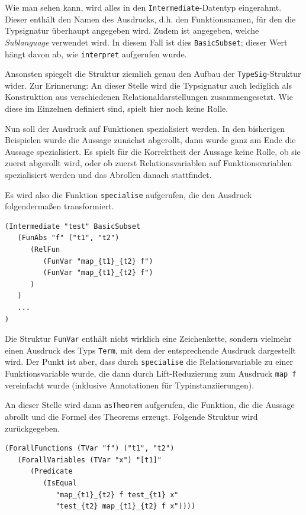 Wie man sehen kann, wird alles in den \texttt{Intermediate}-Datentyp eingerahmt. Dieser enthält den Namen des Ausdrucks, d.h.
den Funktionsnamen, für den die Typsignatur überhaupt angegeben wird. Zudem ist angegeben, welche \textit{Sublanguage}
verwendet wird. In diesem Fall ist dies \texttt{BasicSubset}; dieser Wert hängt davon ab, wie \texttt{interpret} aufgerufen wurde.

Ansonsten spiegelt die Struktur ziemlich genau den Aufbau der \texttt{TypeSig}-Struktur wider. Zur Erinnerung: An dieser Stelle
wird die Typsignatur auch lediglich als Konstruktion aus verschiedenen Relationaldarstellungen zusammengesetzt. Wie diese
im Einzelnen definiert sind, spielt hier noch keine Rolle.

Nun soll der Ausdruck auf Funktionen spezialisiert werden. In den bisherigen Beispielen wurde die Aussage zunächst abgerollt, dann
wurde ganz am Ende die Aussage spezialisiert. Es spielt für die Korrektheit der Aussage keine Rolle, ob sie zuerst abgerollt wird, oder ob
zuerst Relationsvariablen auf Funktionsvariablen spezialisiert werden und das Abrollen danach stattfindet.

Es wird also die Funktion \texttt{specialise} aufgerufen, die den Ausdruck folgendermaßen transformiert.

\begin{verbatim}
(Intermediate "test" BasicSubset 
   (FunAbs "f" ("t1", "t2")
      (RelFun
         (FunVar "map_{t1}_{t2} f")
         (FunVar "map_{t1}_{t2} f")
      )
   )
   ...
)
\end{verbatim}

Die Struktur \texttt{FunVar} enthält nicht wirklich eine Zeichenkette, sondern vielmehr einen Ausdruck des Typs \texttt{Term},
mit dem der entsprechende Ausdruck dargestellt wird. Der Punkt ist aber, dass durch \texttt{specialise} die Relationsvariable
zu einer Funktionsvariable wurde, die dann durch Lift-Reduzierung zum Ausdruck \texttt{map f} vereinfacht wurde (inklusive
Annotationen für Typinstanziierungen).

An dieser Stelle wird dann \texttt{asTheorem} aufgerufen, die Funktion, die die Aussage abrollt und die Formel des Theorems
erzeugt. Folgende Struktur wird zurückgegeben.

\begin{verbatim}
(ForallFunctions (TVar "f") ("t1", "t2")
   (ForallVariables (TVar "x") "[t1]"
      (Predicate
         (IsEqual
            "map_{t1}_{t2} f test_{t1} x"
            "test_{t2} map_{t1}_{t2} f x"))))
\end{verbatim}

